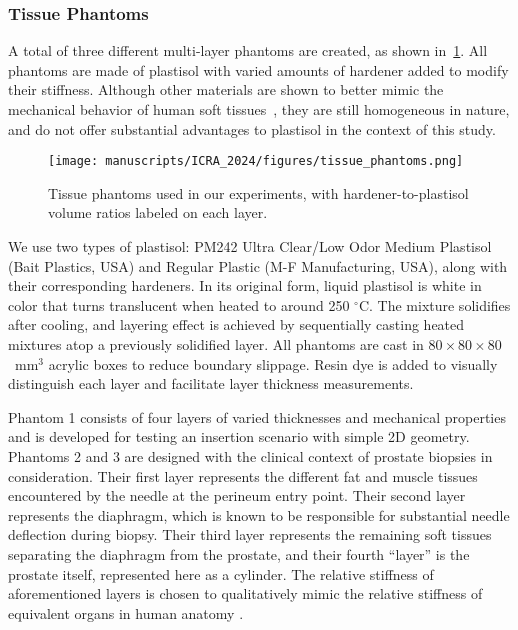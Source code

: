 \subsubsection{Tissue Phantoms}
\label{sec:chap-4-developed-phantoms}

A total of three different multi-layer phantoms are created, as shown in~\cref{fig:chap-4-phantoms}. All phantoms are made of plastisol with varied amounts of hardener added to modify their stiffness. Although other materials are shown to better mimic the mechanical behavior of human soft tissues~\parencite{tejo-oteroSoftTissueMimickingUsingHydrogels2022}, they are still homogeneous in nature, and do not offer substantial advantages to plastisol in the context of this study. 

\begin{figure}[t]
  \centering
  \texttt{[image: manuscripts/ICRA\_2024/figures/tissue\_phantoms.png]}
  \caption{Tissue phantoms used in our experiments, with hardener-to-plastisol volume ratios labeled on each layer.}
  \label{fig:chap-4-phantoms}
\end{figure}

We use two types of plastisol: PM242 Ultra Clear/Low Odor Medium Plastisol (Bait Plastics, USA) and Regular Plastic (M-F Manufacturing, USA), along with their corresponding hardeners. In its original form, liquid plastisol is white in color that turns translucent when heated to around 250 $^{\circ}$C. The mixture solidifies after cooling, and layering effect is achieved by sequentially casting heated mixtures atop a previously solidified layer. All phantoms are cast in $80\times80\times80$~mm$^3$ acrylic boxes to reduce boundary slippage. Resin dye is added to visually distinguish each layer and facilitate layer thickness measurements.

Phantom 1 consists of four layers of varied thicknesses and mechanical properties and is developed for testing an insertion scenario with simple 2D geometry. Phantoms 2 and 3 are designed with the clinical context of prostate biopsies in consideration. Their first layer represents the different fat and muscle tissues encountered by the needle at the perineum entry point. Their second layer represents the diaphragm, which is known to be responsible for substantial needle deflection during biopsy. Their third layer represents the remaining soft tissues separating the diaphragm from the prostate, and their fourth ``layer'' is the prostate itself, represented here as a cylinder. The relative stiffness of aforementioned layers is chosen to qualitatively mimic the relative stiffness of equivalent organs in human anatomy \parencite{boubakerFiniteElementSimulation2009}.

